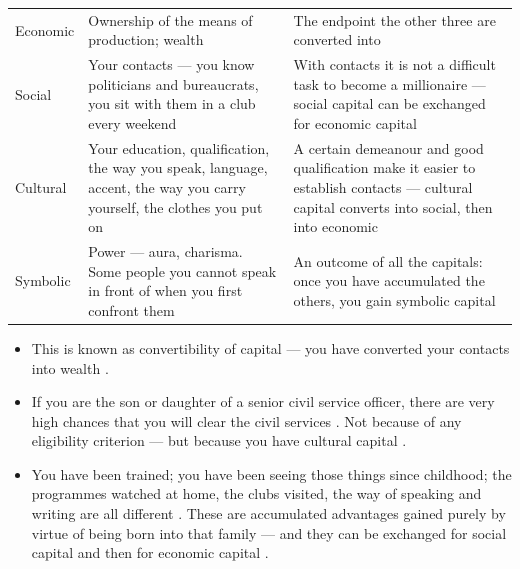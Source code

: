 \begin{table}[h!]
\centering
\begin{tabularx}{\textwidth}{lYY}
\toprule
{}
 &  &  \\
\midrule
Economic & Ownership of the means of production; wealth & The endpoint the other three are converted into \\
Social & Your contacts --- you know politicians and bureaucrats, you sit with them in a club every weekend & With contacts it is not a difficult task to become a millionaire --- social capital can be exchanged for economic capital \\
Cultural & Your education, qualification, the way you speak, language, accent, the way you carry yourself, the clothes you put on & A certain demeanour and good qualification make it easier to establish contacts --- cultural capital converts into social, then into economic \\
Symbolic & Power --- aura, charisma. Some people you cannot speak in front of when you first confront them & An outcome of all the capitals: once you have accumulated the others, you gain symbolic capital \\
\bottomrule
\end{tabularx}
\end{table}

\begin{itemize}
    \item This is known as convertibility of capital --- you have converted your contacts into wealth .
\end{itemize}

\begin{ExampleBox}
\begin{itemize}
    \item If you are the son or daughter of a senior civil service officer, there are very high chances that you will clear the civil services . Not because of any eligibility criterion --- but because you have cultural capital .
    \item You have been trained; you have been seeing those things since childhood; the programmes watched at home, the clubs visited, the way of speaking and writing are all different . These are accumulated advantages gained purely by virtue of being born into that family --- and they can be exchanged for social capital and then for economic capital .
\end{itemize}
\end{ExampleBox}

